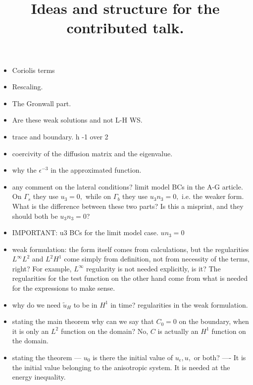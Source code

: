 \documentclass[11pt]{article}
\title{Ideas and structure for the contributed talk.}
\date{}
\begin{document}
\maketitle

\begin{itemize}

\item Coriolis terms

\item Rescaling.

\item The Gronwall part.

\item Are these weak solutions and not L-H WS.

\item trace and boundary. h -1 over 2

\item coercivity of the diffusion matrix and the eigenvalue.

\item why the $\epsilon^{-3}$ in the approximated function.

\item any comment on the lateral conditions? limit model BCs in the A-G article. On $\Gamma_s$ they use $u_3 = 0,$ while on $\Gamma_b$ they use $u_3 n_3 = 0,$ i.e. the weaker form. What is the difference between these two parts? Is this a misprint, and they should both be $u_3 n_3 = 0$?

\item IMPORTANT: u3 BCs for the limit model case. $u n_3 = 0$

\item weak formulation: the form itself comes from calculations, but the regularities $L^\infty L^2$ and $L^2 H^1$ come simply from definition, not from necessity of the terms, right? For example, $L^\infty$ regularity is not needed explicitly, is it? The regularities for the test function on the other hand come from what is needed for the expressions to make sense.

\item why do we need $\tilde{u}_H$ to be in $H^1$ in time? regularities in the weak formulation.

\item stating the main theorem why can we say that $C_0 = 0$ on the boundary, when it is only an $L^2$ function on the domain? No, $C$ is actually an $H^1$ function on the domain.

\item stating the theorem --- $u_0$ is there the initial value of $u_\epsilon, u,$ or both?  ---- It is the initial value belonging to the anisotropic system. It is needed at the energy inequality.


\end{itemize}
\end{document}
